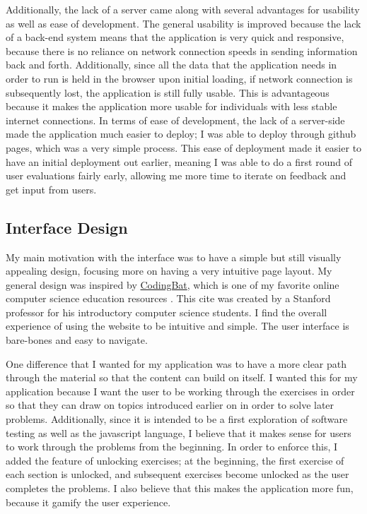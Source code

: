 \documentclass[10pt,twocolumn]{article}
\begin{document}
Additionally, the lack of a server came along with several advantages for usability as well as ease of development. The general
usability is improved because the lack of a back-end system means that the application is very quick and responsive, because 
there is no reliance on network connection speeds in sending information back and forth. Additionally, since all the data 
that the application needs in order to run is held in the browser upon initial loading, if network connection is subsequently 
lost, the application is still fully usable. This is advantageous because it makes the application more usable for individuals 
with less stable internet connections. In terms of ease of development, the lack of a server-side made the application much 
easier to deploy; I was able to deploy through github pages, which was a very simple process. This ease of deployment made 
it easier to have an initial deployment out earlier, meaning I was able to do a first round of user evaluations fairly early, 
allowing me more time to iterate on feedback and get input from users. 


\subsection{Interface Design}

My main motivation with the interface was to have a simple but still visually appealing design, focusing more on having 
a very intuitive page layout. My general design was inspired by \href{https://codingbat.com/java}{CodingBat}, which is one 
of my favorite online computer science education resources \cite{CodingBat}. This cite was created by a Stanford professor 
for his introductory computer science students. I find the overall experience of using the 
website to be intuitive and simple. The user interface is bare-bones and easy to navigate.

One difference that I wanted for my application was to have a more clear path through the material so that the content can
build on itself. I wanted this for my application because I want the user to be working through the exercises in order so 
that they can draw on topics introduced earlier on in order to solve later problems. Additionally, since it is intended to 
be a first exploration of software testing as well as the javascript language, I believe that it makes sense for users to 
work through the problems from the beginning. In order to enforce this, I added the feature of unlocking exercises; at 
the beginning, the first exercise of each section is unlocked, and subsequent exercises become unlocked as the user 
completes the problems. I also believe that this makes the application more fun, because it gamify the user experience. 
\end{document}
